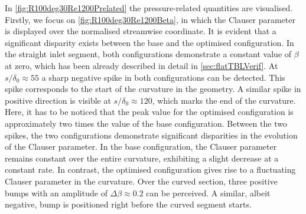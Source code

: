 In \autoref{fig:R100deg30Re1200Prelated} the pressure-related quantities are visualised.
Firstly, we focus on \autoref{fig:R100deg30Re1200Beta}, in which the Clauser parameter is displayed over the normalised streamwise coordinate.
It is evident that a significant disparity exists between the base and the optimised configuration.
In the straight inlet segment, both configurations demonstrate a constant value of $\beta$ at zero, which has been already described in detail in \autoref{sec:flatTBLVerif}.
At $s/\delta_0 \approx 55$ a sharp negative spike in both configurations can be detected.
This spike corresponds to the start of the curvature in the geometry. 
A similar spike in positive direction is visible at $s/\delta_0 \approx 120$, which marks the end of the curvature.
Here, it has to be noticed that the peak value for the optimised configuration is approximately two times the value of the base configuration.
Between the two spikes, the two configurations demonstrate significant disparities in the evolution of the Clauser parameter.
In the base configuration, the Clauser parameter remains constant over the entire curvature, exhibiting a slight decrease at a constant rate. 
In contrast, the optimised configuration gives rise to a fluctuating Clauser parameter in the curvature.
Over the curved section, three positive bumps with an amplitude of $\Delta\beta \approx 0.2$ can be perceived.
A similar, albeit negative, bump is positioned right before the curved segment starts.

